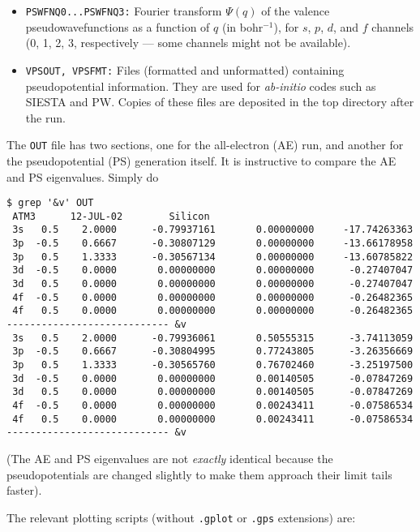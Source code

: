\documentclass[11pt]{article}
\begin{document}
\begin{itemize}
\item {\tt PSWFNQ0...PSWFNQ3:} Fourier transform $\Psi(q)$ of the 
valence pseudowavefunctions as a function of $q$ (in
bohr$^{-1}$), for $s$, $p$, $d$, and $f$ channels (0, 1, 2, 3,
respectively --- some channels might not be available).

\item {\tt VPSOUT, VPSFMT:} Files (formatted and unformatted)
containing pseudopotential information. They are used for {\it
ab-initio} codes such as {\sc SIESTA} and {\sc PW}. Copies of these
files are deposited in the top directory after the run.

\end{itemize}

The {\tt OUT} file has two sections, one for the all-electron (AE) run, and
another for the pseudopotential (PS) generation itself. It is instructive to
compare the AE and PS eigenvalues. Simply do

\begin{verbatim}
$ grep '&v' OUT
 ATM3      12-JUL-02        Silicon
 3s   0.5    2.0000      -0.79937161       0.00000000     -17.74263363
 3p  -0.5    0.6667      -0.30807129       0.00000000     -13.66178958
 3p   0.5    1.3333      -0.30567134       0.00000000     -13.60785822
 3d  -0.5    0.0000       0.00000000       0.00000000      -0.27407047
 3d   0.5    0.0000       0.00000000       0.00000000      -0.27407047
 4f  -0.5    0.0000       0.00000000       0.00000000      -0.26482365
 4f   0.5    0.0000       0.00000000       0.00000000      -0.26482365
---------------------------- &v
 3s   0.5    2.0000      -0.79936061       0.50555315      -3.74113059
 3p  -0.5    0.6667      -0.30804995       0.77243805      -3.26356669
 3p   0.5    1.3333      -0.30565760       0.76702460      -3.25197500
 3d  -0.5    0.0000       0.00000000       0.00140505      -0.07847269
 3d   0.5    0.0000       0.00000000       0.00140505      -0.07847269
 4f  -0.5    0.0000       0.00000000       0.00243411      -0.07586534
 4f   0.5    0.0000       0.00000000       0.00243411      -0.07586534
---------------------------- &v
\end{verbatim}

(The AE and PS eigenvalues are not {\sl exactly} identical because the
pseudopotentials are changed slightly to make them approach their
limit tails faster).

The relevant plotting scripts (without {\tt .gplot} or {\tt .gps}
extensions) are:
\end{document}
